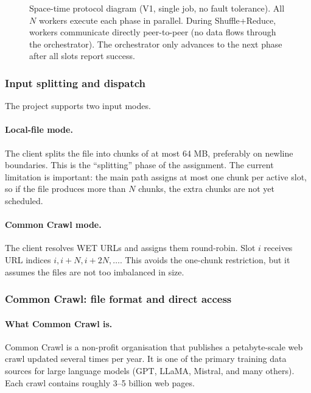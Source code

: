 \documentclass[11pt,a4paper]{article}
\begin{document}
\begin{figure}[H]
\caption{Space-time protocol diagram (V1, single job, no fault tolerance).
All \(N\) workers execute each phase in parallel.  During Shuffle+Reduce,
workers communicate directly peer-to-peer (no data flows through the
orchestrator).  The orchestrator only advances to the next phase after all
slots report success.}
\end{figure}



\subsubsection{Input splitting and dispatch}

The project supports two input modes.

\paragraph{Local-file mode.}
The client splits the file into chunks of at most 64 MB, preferably on newline
boundaries. This is the ``splitting'' phase of the assignment. The current
limitation is important: the main path assigns at most one chunk per active
slot, so if the file produces more than \(N\) chunks, the extra chunks are not
yet scheduled.

\paragraph{Common Crawl mode.}
The client resolves WET URLs and assigns them round-robin. Slot \(i\) receives
URL indices \(i, i+N, i+2N,\ldots\). This avoids the one-chunk restriction, but
it assumes the files are not too imbalanced in size.

\subsubsection{Common Crawl: file format and direct access}

\paragraph{What Common Crawl is.}
Common Crawl is a non-profit organisation that publishes a petabyte-scale web
crawl updated several times per year. It is one of the primary training data
sources for large language models (GPT, LLaMA, Mistral, and many others). Each
crawl contains roughly 3--5 billion web pages.
\end{document}
